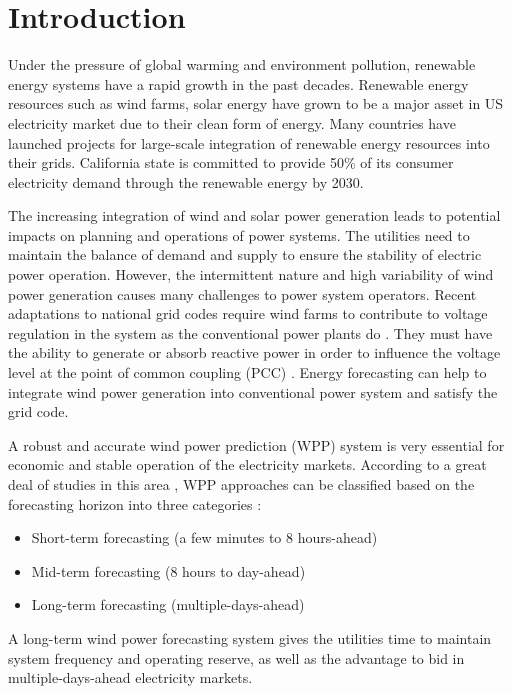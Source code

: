 \documentclass[conference]{IEEEtran}
\begin{document}
%
\IEEEpeerreviewmaketitle



\section{Introduction}
Under the pressure of global warming and environment pollution, renewable energy systems have a rapid growth in the past decades. Renewable energy resources such as wind farms, solar energy have grown to be a major asset in US electricity market due to their clean form of energy. Many countries have launched projects for large-scale integration of renewable energy resources into their grids. California state is committed to provide 50\% of its consumer electricity demand through the renewable energy by 2030. 

The increasing integration of wind and solar power generation leads to potential impacts on planning and operations of power systems. The utilities need to maintain the balance of demand and supply to ensure the stability of electric power operation. However, the intermittent nature and high variability of wind power generation causes many challenges to power system operators. Recent adaptations to national grid codes require wind farms to contribute to voltage regulation in the system as the conventional power plants do \cite{8778495}. They must have the ability to generate or absorb reactive power in order to influence the voltage level at the point of common coupling (PCC) \cite{MOHSENI20123876}. Energy forecasting can help to integrate wind power generation into conventional power system and satisfy the grid code. 

A robust and accurate wind power prediction (WPP) system is very essential for economic and stable operation of the electricity markets. According to a great deal of studies in this area \cite{6730905,LAZIC2014567,8489472}, WPP approaches can be classified based on the forecasting horizon into three categories \cite{WANG2011770}:
\begin{itemize}
\item Short-term forecasting (a few minutes to 8 hours-ahead)
\item Mid-term forecasting (8 hours to day-ahead)
\item Long-term forecasting (multiple-days-ahead)
\end{itemize}
A long-term wind power forecasting system gives the utilities time to maintain system frequency and operating reserve, as well as the advantage to bid in multiple-days-ahead electricity markets. 
\end{document}

